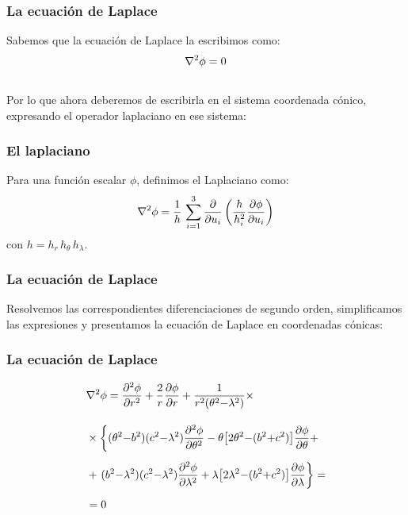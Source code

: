 \begin{frame}
\frametitle{La ecuación de Laplace}
Sabemos que la ecuación de Laplace la escribimos como:
\begin{align*}
\laplacian{\phi} = 0
\end{align*}
\\
\bigskip
\pause
Por lo que ahora deberemos de escribirla en el sistema coordenada cónico, expresando el operador laplaciano en ese sistema:
\end{frame}
\begin{frame}
\frametitle{El laplaciano}
Para una función escalar $\phi$, definimos el Laplaciano como:
\begin{align*}
\laplacian{\phi} = \dfrac{1}{h} \, \sum_{i=1}^{3} \pdv{u_{i}} \left( \dfrac{h}{h_{i}^{2}}  \pdv{\phi}{u_{i}} \right)
\end{align*}
con $h = h_{r} \, h_{\theta} \, h_{\lambda}$.
\end{frame}
\begin{frame}
\frametitle{La ecuación de Laplace}
Resolvemos las correspondientes diferenciaciones de segundo orden, simplificamos las expresiones y presentamos la ecuación de Laplace en coordenadas cónicas:
\end{frame}
\begin{frame}
\frametitle{La ecuación de Laplace}
\begin{align*}
&\laplacian{\phi} = \pdv[2]{\phi}{r} + \dfrac{2}{r} \pdv{\phi}{r} + \dfrac{1}{r^{2} (\theta^{2} {-} \lambda^{2})} \times \\[1em]
&\times \left\{ (\theta^{2} {-} b^{2})(c^{2} {-} \lambda^{2}) \pdv[2]{\phi}{\theta} - \theta \big[ 2 \theta^{2} {-} (b^{2} {+} c^{2}) \big] \pdv{\phi}{\theta} + \right.\\[0.5em]
&+ \left. (b^{2} {-} \lambda^{2})(c^{2} {-} \lambda^{2}) \pdv[2]{\phi}{\lambda} + \lambda \big[ 2 \lambda^{2} {-} (b^{2} {+} c^{2}) \big] \pdv{\phi}{\lambda} \right\} = \\[0.5em]
&= 0
\end{align*}
\end{frame}
